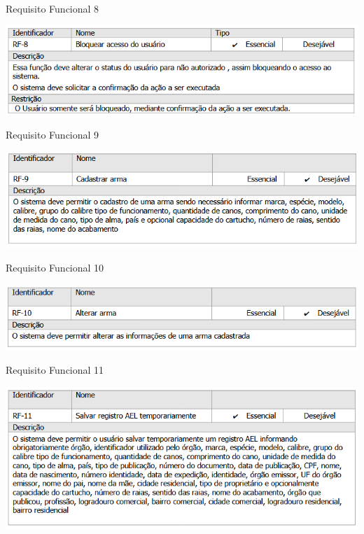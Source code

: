 \begin{table}[h]
    \caption{Requisito Funcional 8}
    \centering
    \includegraphics[scale=0.9]{imagens/rf08.png}
    \label{tab:rf08}
\end{table}

\begin{table}[h]
    \caption{Requisito Funcional 9}
    \centering
    \includegraphics[scale=0.9]{imagens/rf09.png}
    \label{tab:rf09}
\end{table}

\begin{table}[h]
    \caption{Requisito Funcional 10}
    \centering
    \includegraphics[scale=0.9]{imagens/rf10.png}
    \label{tab:rf10}
\end{table}

\begin{table}[h]
    \caption{Requisito Funcional 11}
    \centering
    \includegraphics[scale=0.9]{imagens/rf11.png}
    \label{tab:rf11}
\end{table}

